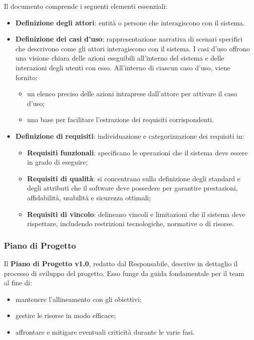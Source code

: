 Il documento comprende i seguenti elementi essenziali:
\begin{itemize}
    \item \textbf{Definizione degli attori}: entità o persone che interagiscono con il sistema.
    \item \textbf{Definizione dei casi d’uso}: rappresentazione narrativa di scenari specifici che descrivono come gli attori interagiscono con il sistema. I casi d’uso offrono una visione chiara delle azioni eseguibili all’interno del sistema e delle interazioni degli utenti con esso. All’interno di ciascun caso d’uso, viene fornito:
    \begin{itemize}
        \item un elenco preciso delle azioni intraprese dall’attore per attivare il caso d’uso;
        \item una base per facilitare l’estrazione dei requisiti corrispondenti.
    \end{itemize}
    \item \textbf{Definizione di requisiti}: individuazione e categorizzazione dei requisiti in:
    \begin{itemize}
        \item \textbf{Requisiti funzionali}: specificano le operazioni che il sistema deve essere in grado di eseguire;
        \item \textbf{Requisiti di qualità}: si concentrano sulla definizione degli standard e degli attributi che il software deve possedere per garantire prestazioni, affidabilità, usabilità e sicurezza ottimali;
        \item \textbf{Requisiti di vincolo}: delineano vincoli e limitazioni che il sistema deve rispettare, includendo restrizioni tecnologiche, normative o di risorse.
    \end{itemize}
\end{itemize}

\subsubsection{Piano di Progetto}
Il \textbf{Piano di Progetto v1.0}, redatto dal Responsabile, descrive in dettaglio il processo di sviluppo del progetto. Esso funge da guida fondamentale per il team al fine di:
\begin{itemize}
    \item mantenere l’allineamento con gli obiettivi;
    \item gestire le risorse in modo efficace;
    \item affrontare e mitigare eventuali criticità durante le varie fasi.
\end{itemize}

